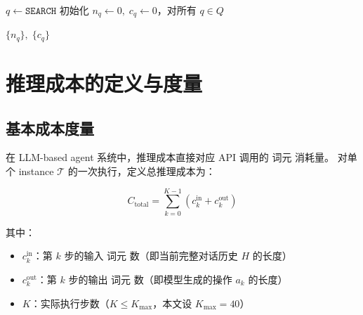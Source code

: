 \begin{algorithm}[H]
\caption{agent 轨迹阶段状态机}
\label{alg:state-machine}

\BlankLine
$q \leftarrow \texttt{SEARCH}$\;
初始化 $n_q \leftarrow 0,\; c_q \leftarrow 0$，对所有 $q \in Q$\;

\BlankLine
{}
\Return $\{n_q\},\; \{c_q\}$\;
\end{algorithm}


\section{推理成本的定义与度量}
\label{sec:cost-definition}

\subsection{基本成本度量}
\label{subsec:basic-cost}

在 LLM-based agent 系统中，推理成本直接对应 API 调用的 词元 消耗量。
对单个 instance $\mathcal{T}$ 的一次执行，定义总推理成本为：

\begin{equation}
  C_{\text{total}} = \sum_{k=0}^{K-1} \left( c_k^{\text{in}} + c_k^{\text{out}} \right)
  \label{eq:cost-total}
\end{equation}

其中：
\begin{itemize}
  \item $c_k^{\text{in}}$：第 $k$ 步的输入 词元 数（即当前完整对话历史 $H$ 的长度）
  \item $c_k^{\text{out}}$：第 $k$ 步的输出 词元 数（即模型生成的操作 $a_k$ 的长度）
  \item $K$：实际执行步数（$K \leq K_{\max}$，本文设 $K_{\max} = 40$）
\end{itemize}

